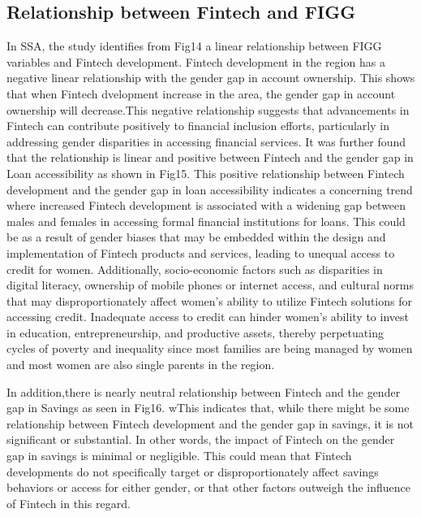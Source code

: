 \documentclass[preprint, 3p,
authoryear]{elsarticle} %
\begin{document}
\hypertarget{relationship-between-fintech-and-figg}{%
\subsection{Relationship between Fintech and
FIGG}\label{relationship-between-fintech-and-figg}}

In SSA, the study identifies from Fig14 a linear relationship between
FIGG variables and Fintech development. Fintech development in the
region has a negative linear relationship with the gender gap in account
ownership. This shows that when Fintech dvelopment increase in the area,
the gender gap in account ownership will decrease.This negative
relationship suggests that advancements in Fintech can contribute
positively to financial inclusion efforts, particularly in addressing
gender disparities in accessing financial services. It was further found
that the relationship is linear and positive between Fintech and the
gender gap in Loan accessibility as shown in Fig15. This positive
relationship between Fintech development and the gender gap in loan
accessibility indicates a concerning trend where increased Fintech
development is associated with a widening gap between males and females
in accessing formal financial institutions for loans. This could be as a
result of gender biases that may be embedded within the design and
implementation of Fintech products and services, leading to unequal
access to credit for women. Additionally, socio-economic factors such as
disparities in digital literacy, ownership of mobile phones or internet
access, and cultural norms that may disproportionately affect women's
ability to utilize Fintech solutions for accessing credit. Inadequate
access to credit can hinder women's ability to invest in education,
entrepreneurship, and productive assets, thereby perpetuating cycles of
poverty and inequality since most families are being managed by women
and most women are also single parents in the region.

In addition,there is nearly neutral relationship between Fintech and the
gender gap in Savings as seen in Fig16. wThis indicates that, while
there might be some relationship between Fintech development and the
gender gap in savings, it is not significant or substantial. In other
words, the impact of Fintech on the gender gap in savings is minimal or
negligible. This could mean that Fintech developments do not
specifically target or disproportionately affect savings behaviors or
access for either gender, or that other factors outweigh the influence
of Fintech in this regard.
\end{document}
